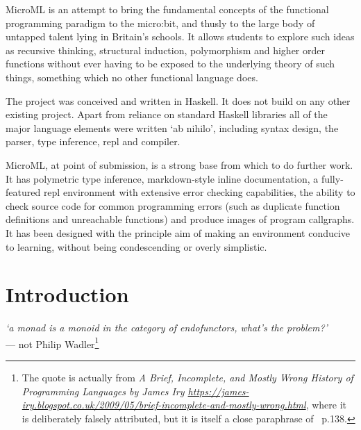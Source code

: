 \documentclass[12pt, a4paper]{report}
\begin{document}
MicroML is an attempt to bring the fundamental concepts of the functional programming paradigm to
the micro:bit, and thusly to the large body of untapped talent lying in Britain's schools. It 
allows students to explore such ideas as recursive thinking, structural induction, polymorphism
and higher order functions without ever having to be exposed to the underlying theory of such things,
something which no other functional language does.

The project was conceived and written in Haskell. It does not build on any other existing
project. Apart from reliance on standard Haskell libraries all of the major language elements were 
written `ab nihilo', including syntax design, the parser, type inference, repl and compiler.  

MicroML, at point of submission, is a strong base from which to do further work. It has
polymetric type inference, markdown-style inline documentation, a fully-featured repl
environment with extensive error checking capabilities, the ability to check source code for
common programming errors (such as duplicate function definitions and unreachable functions) and
produce images of program callgraphs. It has been designed with the principle aim of making an
environment conducive to learning, without being condescending or overly simplistic. 

\clearpage
{}
\chapter{Introduction}

\begin{flushright} \textit{`a monad is a monoid in the category of endofunctors, what's
the problem?'} \\ --- not Philip Wadler\footnote{The quote is actually from \textit{A
Brief, Incomplete, and Mostly Wrong History of Programming Languages by James Iry
\url{https://james-iry.blogspot.co.uk/2009/05/brief-incomplete-and-mostly-wrong.html}}, where it is
deliberately falsely attributed, but it is itself a close paraphrase of~\cite{opac-b1078351} p.138.} 
\end{flushright}
\end{document}
